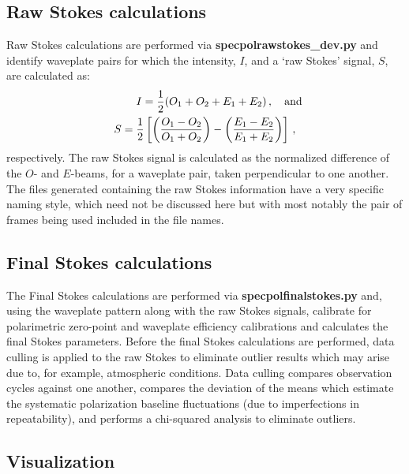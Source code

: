 \subsection{Raw Stokes calculations}

Raw Stokes calculations are performed via \textbf{specpolraw\-stokes\_dev.py} and identify waveplate pairs for which the intensity, $I$, and a `raw Stokes' signal, $S$, are calculated as:
\begin{equation}
    \begin{gathered}
        I = \frac{1}{2} (O_{1} + O_{2} + E_{1} + E_{2})\,,\rlap{\quad and}\\
        S = \frac{1}{2} \left[ \left( \frac{O_{1} - O_{2}}{O_{1} + O_{2}} \right) - \left( \frac{E_{1} - E_{2}}{E_{1} + E_{2}} \right) \right]\,,
    \end{gathered}\label{eq:polsalt_rawstokes}
\end{equation}
respectively. The raw Stokes signal is calculated as the normalized difference of the $O$- and $E$-beams, for a waveplate pair, taken perpendicular to one another. The files generated containing the raw Stokes information have a very specific naming style, which need not be discussed here but with most notably the pair of frames being used included in the file names.

\subsection{Final Stokes calculations}

The Final Stokes calculations are performed via \textbf{specpolfinalstokes.py} and, using the waveplate pattern along with the raw Stokes signals, calibrate for polarimetric zero-point and waveplate efficiency calibrations and calculates the final Stokes parameters. Before the final Stokes calculations are performed, data culling is applied to the raw Stokes to eliminate outlier results which may arise due to, for example, atmospheric conditions. Data culling compares observation cycles against one another, compares the deviation of the means which estimate the systematic polarization baseline fluctuations (due to imperfections in repeatability), and performs a chi-squared analysis to eliminate outliers.

\subsection{Visualization}

